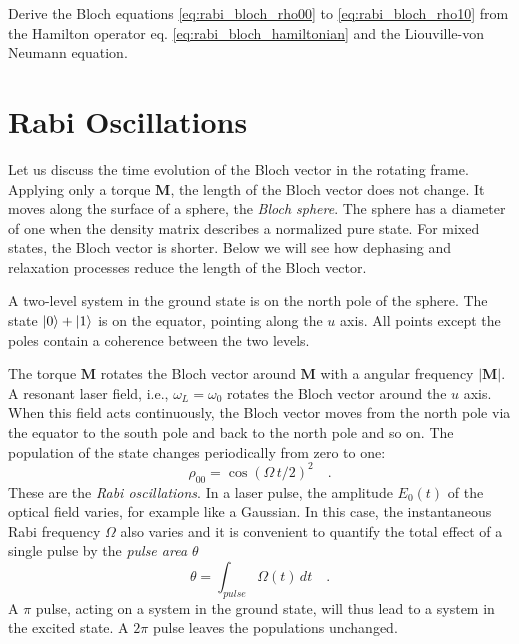 \begin{questions}

\item Derive the Bloch  equations \ref{eq:rabi_bloch_rho00}  to \ref{eq:rabi_bloch_rho10}  
from the Hamilton operator eq. \ref{eq:rabi_bloch_hamiltonian} and the Liouville-von Neumann equation.

\end{questions}

\section{Rabi Oscillations}

Let us discuss the time evolution of the Bloch vector in the rotating frame. Applying only a torque $\boldsymbol{M}$, the length of the Bloch vector does not change. It moves along the surface of a sphere, the \emph{Bloch sphere}. The sphere has a diameter of one when the density matrix describes a normalized pure state. For mixed states, the Bloch vector is shorter. Below we will see how dephasing and relaxation processes reduce the length of the Bloch vector.


A two-level system in the ground state is on the north pole of the sphere. The state $\ket{0} + \ket{1}$ is on the equator, pointing along the $u$ axis. All points except the poles contain a coherence between the two levels.


\begin{marginfigure}
\centering

\caption{Some Bloch vectors and their positions on the Bloch sphere. \label{fig:rabi_bloch_sphere}}
\end{marginfigure}


The torque $\boldsymbol{M}$ rotates the Bloch vector around  $\boldsymbol{M}$ with a angular frequency  $|\boldsymbol{M}|$. A resonant laser field, i.e., $\omega_L = \omega_0$ rotates the Bloch vector around the $u$ axis. When this field acts continuously, the Bloch vector moves from the north pole via the equator to the south pole and back to the north pole and so on. The population of the state changes periodically from zero to one:
\begin{equation}
 \rho_{00} = \cos ( \Omega \, t / 2)^2 \quad .
\end{equation}
These are the \emph{Rabi oscillations}. In a laser pulse, the amplitude $E_0(t)$ of the optical field varies, for example like a Gaussian. In this case, the instantaneous Rabi frequency $\Omega$ also varies and it is convenient to quantify the total effect of a single pulse by the \emph{pulse area $\theta$}
\begin{equation}
 \theta = \int_{pulse} \Omega (t) \, dt \quad .
\end{equation}
A $\pi$ pulse, acting on a system in the ground state, will thus lead to a system in the excited state. A $2\pi$ pulse leaves the populations unchanged.


